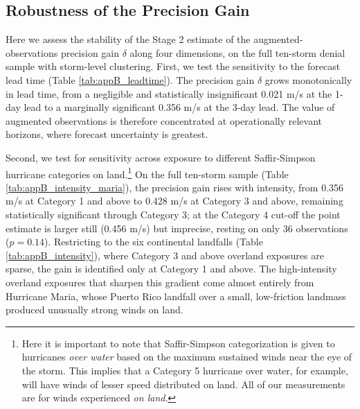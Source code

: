 \documentclass[12pt]{article}%
\begin{document}
\begin{appendices}




\section{Robustness of the Precision Gain} \label{app:delta}

Here we assess the stability of the Stage 2 estimate of the augmented-observations precision gain $\delta$ along four dimensions, on the full ten-storm denial sample with storm-level clustering. First, we test the sensitivity to the forecast lead time (Table \ref{tab:appB_leadtime}). The precision gain $\delta$ grows monotonically in lead time, from a negligible and statistically insignificant 0.021 m/s at the 1-day lead to a marginally significant 0.356 m/s at the 3-day lead. The value of augmented observations is therefore concentrated at operationally relevant horizons, where forecast uncertainty is greatest.

Second, we test for sensitivity across exposure to different Saffir-Simpson hurricane categories on land.\footnote{Here it is important to note that Saffir-Simpson categorization is given to hurricanes \emph{over water} based on the maximum sustained winds near the eye of the storm. This implies that a Category 5 hurricane over water, for example, will have winds of lesser speed distributed on land. All of our measurements are for winds experienced \emph{on land}.} On the full ten-storm sample (Table \ref{tab:appB_intensity_maria}), the precision gain rises with intensity, from 0.356 m/s at Category 1 and above to 0.428 m/s at Category 3 and above, remaining statistically significant through Category 3; at the Category 4 cut-off the point estimate is larger still (0.456 m/s) but imprecise, resting on only 36 observations ($p = 0.14$). Restricting to the six continental landfalls (Table \ref{tab:appB_intensity}), where Category 3 and above overland exposures are sparse, the gain is identified only at Category 1 and above. The high-intensity overland exposures that sharpen this gradient come almost entirely from Hurricane Maria, whose Puerto Rico landfall over a small, low-friction landmass produced unusually strong winds on land.


\end{appendices}
\end{document}
